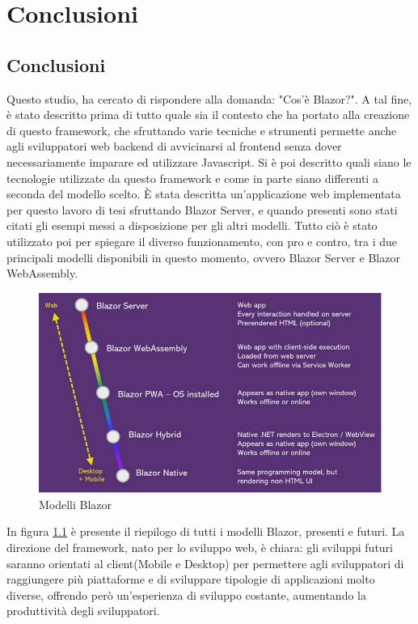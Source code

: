\chapter{Conclusioni}\label{cap:conclusioni}
\section{Conclusioni}\label{sez:conclusioni}
Questo studio, ha cercato di rispondere alla domanda: "Cos'\`e Blazor?".
A tal fine, \`e stato descritto prima di tutto quale sia il contesto che ha portato alla creazione di questo framework, che sfruttando varie tecniche e strumenti permette anche agli sviluppatori web backend di avvicinarsi al frontend senza dover necessariamente imparare ed utilizzare Javascript.
Si \`e poi descritto quali siano le tecnologie utilizzate da questo framework e come in parte siano differenti a seconda del modello scelto.
\`E stata descritta un'applicazione web implementata per questo lavoro di tesi sfruttando Blazor Server, e quando presenti sono stati citati gli esempi messi a disposizione per gli altri modelli.
Tutto ci\`o \`e stato utilizzato poi per spiegare il diverso funzionamento, con pro e contro, tra i due principali modelli disponibili in questo momento, ovvero Blazor Server e Blazor WebAssembly. 

\begin{figure}[H]
	\centerline{\includegraphics[scale=0.5]{figure/BlazorModels.PNG}}
	\caption{Modelli Blazor}
	\label{fig:blazorModels}
\end{figure}

In figura \ref{fig:blazorModels} \`e presente il riepilogo di tutti i modelli Blazor, presenti e futuri.
La direzione del framework, nato per lo sviluppo web, \`e chiara: gli sviluppi futuri saranno orientati al client(Mobile e Desktop) per permettere agli sviluppatori di raggiungere pi\`u piattaforme e di sviluppare tipologie di applicazioni molto diverse, offrendo per\`o un'esperienza di sviluppo costante, aumentando la produttivit\`a degli sviluppatori.


